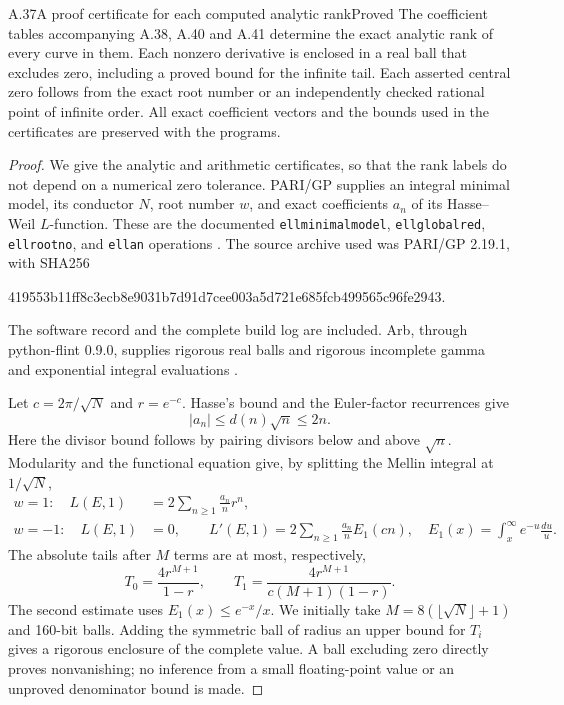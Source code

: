\begin{statement}{A.37}{A proof certificate for each computed analytic rank}{Proved}
The coefficient tables accompanying A.38, A.40 and A.41 determine the exact
analytic rank of every curve in them. Each nonzero derivative is enclosed
in a real ball that excludes zero, including a proved bound for the
infinite tail. Each asserted central zero follows from the exact root
number or an independently checked rational point of infinite order.
All exact coefficient vectors and the bounds used in the certificates are
preserved with the programs.
\end{statement}
\begin{proof}
We give the analytic and arithmetic certificates, so that the rank labels
do not depend on a numerical zero tolerance. PARI/GP supplies an integral
minimal model, its conductor $N$, root number $w$, and exact coefficients
$a_n$ of its Hasse--Weil $L$-function. These are the documented
\texttt{ellminimalmodel}, \texttt{ellglobalred}, \texttt{ellrootno}, and
\texttt{ellan} operations \citep{AMPARI2026}. The source archive used was
PARI/GP 2.19.1, with SHA256
\begin{center}\scriptsize\ttfamily
419553b11ff8c3ecb8e9031b7d91d7cee003a5d721e685fcb499565c96fe2943.
\end{center}
The software record and the complete build log are included. Arb, through
python-flint 0.9.0, supplies rigorous real balls and rigorous incomplete
gamma and exponential integral evaluations
\citep{AMJohansson2017,AMPythonFlint2026}.

Let $c=2\pi/\sqrt N$ and $r=e^{-c}$. Hasse's bound and the Euler-factor
recurrences give
\[
 |a_n|\leq d(n)\sqrt n\leq2n.
\]
Here the divisor bound follows by pairing divisors below and above
$\sqrt n$. Modularity and the functional equation give, by splitting
the Mellin integral at $1/\sqrt N$,
\begin{align*}
 w=1:\quad L(E,1)&=2\sum_{n\geq1}\frac{a_n}{n}r^n,\\
 w=-1:\quad L(E,1)&=0,\qquad
 L'(E,1)=2\sum_{n\geq1}\frac{a_n}{n}E_1(cn),
 \quad E_1(x)=\int_x^\infty e^{-u}\frac{du}{u}.
\end{align*}
The absolute tails after $M$ terms are at most, respectively,
\[
 T_0=\frac{4r^{M+1}}{1-r},\qquad
 T_1=\frac{4r^{M+1}}{c(M+1)(1-r)}.
\]
The second estimate uses $E_1(x)\leq e^{-x}/x$. We initially take
$M=8(\lfloor\sqrt N\rfloor+1)$ and 160-bit balls. Adding the symmetric
ball of radius an upper bound for $T_i$ gives a rigorous enclosure of the
complete value. A ball excluding zero directly proves nonvanishing;
no inference from a small floating-point value or an unproved denominator
bound is made.


\end{proof}
